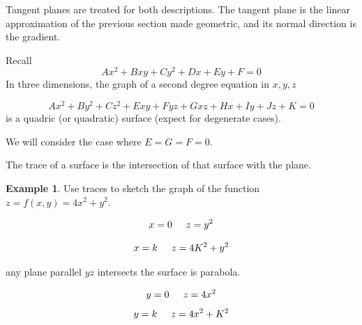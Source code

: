 \documentclass[11pt,a4paper]{article}
\theoremstyle{definition}
\newtheorem{exa}[thm]{Example}
\begin{document}
Tangent planes are treated for both descriptions. The tangent plane is the
linear approximation of the previous section made geometric, and its normal
direction is the gradient.


Recall $$Ax^2 + Bxy + Cy^2 + Dx + Ey + F = 0$$
In three dimensions, the graph of a second degree equation in $x,y,z$

$$Ax^2 + By^2 + Cz^2 + Exy + Fyz + Gxz + Hx + Iy + Jz + K =0$$ is a quadric (or quadratic) surface (expect for degenerate cases).


 We will consider the case where $E = G = F =0$.


 The trace of a surface is the intersection of that surface with the plane.


\begin{exa}


Use traces to sketch the graph of the function $z = f(x,y) = 4x^2 + y^2$.

$$x = 0\hspace{0.5cm} z = y^2$$

$$ x = k\hspace{0.5cm} z = 4K^2 + y^2$$


\begin{figure}[H]
\centering
{}
\end{figure}

any plane parallel $yz$ intersects the surface is parabola.

$$y = 0 \hspace{0.5cm} z = 4x^2$$
$$y=k \hspace{0.5cm} z = 4x^2 + K^2$$


\begin{figure}[H]
\centering
{}
\end{figure}


\end{exa}
\end{document}
